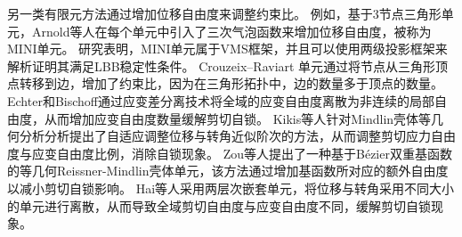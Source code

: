 另一类有限元方法通过增加位移自由度来调整约束比。
例如，基于3节点三角形单元，Arnold等人\cite{arnold1984,auricchio2005}在每个单元中引入了三次气泡函数来增加位移自由度，被称为MINI单元。
研究表明，MINI单元属于VMS框架\cite{quarteroni1994}，并且可以使用两级投影框架来解析证明其满足LBB稳定性条件。
Crouzeix--Raviart 单元\cite{crouzeix1973}通过将节点从三角形顶点转移到边，增加了约束比，因为在三角形拓扑中，边的数量多于顶点的数量。
Echter和Bischoff\cite{Echter2010}通过应变差分离技术将全域的应变自由度离散为非连续的局部自由度，从而增加应变自由度数量缓解剪切自锁。
Kikis等人\cite{Kikis2019}针对Mindlin壳体等几何分析分析提出了自适应调整位移与转角近似阶次的方法，从而调整剪切应力自由度与应变自由度比例，消除自锁现象。
Zou等人\cite{Zou2020}提出了一种基于Bézier双重基函数的等几何Reissner-Mindlin壳体单元，该方法通过增加基函数所对应的额外自由度以减小剪切自锁影响。
Hai等人\cite{Hai2022}采用两层次嵌套单元，将位移与转角采用不同大小的单元进行离散，从而导致全域剪切自由度与应变自由度不同，缓解剪切自锁现象。

